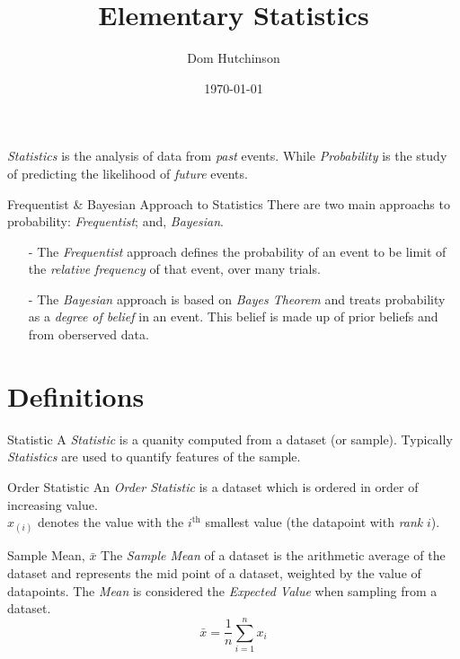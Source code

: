 \documentclass[11pt,a4paper]{article}
\begin{document}
\title{Elementary Statistics}
\author{Dom Hutchinson}
\date{\today}
\maketitle

\textit{Statistics} is the analysis of data from \textit{past} events. While \textit{Probability} is the study of predicting the likelihood of \textit{future} events.\\

\begin{remark}{Frequentist \& Bayesian Approach to Statistics}
  There are two main approachs to probability: \textit{Frequentist}; and, \textit{Bayesian}.
  \begin{itemize}
      \item[-] The \textit{Frequentist} approach defines the probability of an event to be limit of the \textit{relative frequency} of that event, over many trials.
      \item[-] The \textit{Bayesian} approach is based on \textit{Bayes Theorem} and treats probability as a \textit{degree of belief} in an event. This belief is made up of prior beliefs and from oberserved data.
  \end{itemize}
\end{remark}

\section{Definitions}

\begin{definition}{Statistic}
  A \textit{Statistic} is a quanity computed from a dataset (or sample). Typically \textit{Statistics} are used to quantify features of the sample.
\end{definition}

\begin{definition}{Order Statistic}
An \textit{Order Statistic} is a dataset which is ordered in order of increasing value.\\
$x_{(i)}$ denotes the value with the $i^\text{th}$ smallest value (the datapoint with \textit{rank} $i$).
\end{definition}

\begin{definition}{Sample Mean, $\bar{x}$}
The \textit{Sample Mean} of a dataset is the arithmetic average of the dataset and represents the mid point of a dataset, weighted by the value of datapoints. The \textit{Mean} is considered the \textit{Expected Value} when sampling from a dataset.
\[
  \bar{x}=\frac1n\sum_{i=1}^nx_i
\]
\end{definition}
\end{document}
